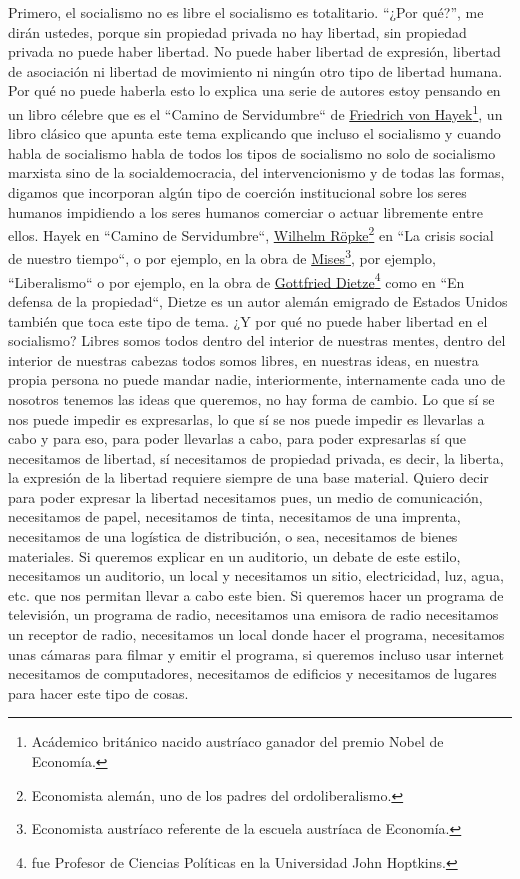 Primero, el socialismo no es libre el socialismo es totalitario. \enquote{¿Por qué?}, me dirán ustedes, porque sin propiedad privada no hay libertad, sin propiedad privada no puede haber libertad. No puede haber libertad de expresión, libertad de asociación ni libertad de movimiento ni ningún otro tipo de libertad humana. Por qué no puede haberla esto lo explica una serie de autores estoy pensando en un libro célebre que es el ``Camino de Servidumbre``\citep{hayek1944road} de \href{https://en.wikipedia.org/wiki/Friedrich_Hayek}{Friedrich von Hayek}\footnote{Acádemico británico nacido austríaco ganador del premio Nobel de Economía.}, un libro clásico que apunta este tema explicando que incluso el socialismo y cuando habla de socialismo habla de todos los tipos de socialismo no solo de socialismo marxista sino de la socialdemocracia, del intervencionismo y de todas las formas, digamos que incorporan algún tipo de coerción institucional sobre los seres humanos impidiendo a los seres humanos comerciar o actuar libremente entre ellos. Hayek en ``Camino de Servidumbre``, \href{https://en.wikipedia.org/wiki/Wilhelm_R%C3%B6pke}{Wilhelm Röpke}\footnote{Economista alemán, uno de los padres del ordoliberalismo.} en ``La crisis social de nuestro tiempo``\citep{ropke1950social}, o por ejemplo, en la obra de \href{https://en.wikipedia.org/wiki/Ludwig_von_Mises}{Mises}\footnote{Economista austríaco referente de la escuela austríaca de Economía.}, por ejemplo, ``Liberalismo``\citep{vonmises1995liberalism} o por ejemplo, en la obra de \href{https://mises.org/mises-daily/who-was-gottfried-dietze}{Gottfried Dietze}\footnote{fue Profesor de Ciencias Políticas en la Universidad John Hoptkins.} como en ``En defensa de la propiedad``\citep{dietze1963defense}, Dietze es un autor alemán emigrado de Estados Unidos también que toca este tipo de tema. ¿Y por qué no puede haber libertad en el socialismo? Libres somos todos dentro del interior de nuestras mentes, dentro del interior de nuestras cabezas todos somos libres, en nuestras ideas, en nuestra propia persona no puede mandar nadie, interiormente, internamente cada uno de nosotros tenemos las ideas que queremos, no hay forma de cambio. Lo que sí se nos puede impedir es expresarlas, lo que sí se nos puede impedir es llevarlas a cabo y para eso, para poder llevarlas a cabo, para poder expresarlas sí que necesitamos de libertad, sí necesitamos de propiedad privada, es decir, la liberta, la expresión de la libertad requiere siempre de una base material. Quiero decir para poder expresar la libertad necesitamos pues, un medio de comunicación, necesitamos de papel, necesitamos de tinta, necesitamos de una imprenta, necesitamos de una logística de distribución, o sea, necesitamos de bienes materiales. Si queremos explicar en un auditorio, un debate de este estilo, necesitamos un auditorio, un local y necesitamos un sitio, electricidad, luz, agua, etc. que nos permitan llevar a cabo este bien. Si queremos hacer un programa de televisión, un programa de radio, necesitamos una emisora de radio necesitamos un receptor de radio, necesitamos un local donde hacer el programa, necesitamos unas cámaras para filmar y emitir el programa, si queremos incluso usar internet necesitamos de computadores,
necesitamos de edificios y necesitamos de lugares para hacer este tipo de cosas.

